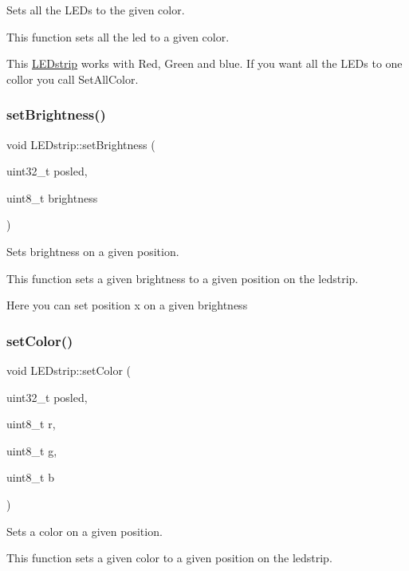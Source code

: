 Sets all the L\+E\+Ds to the given color. 

This function sets all the led to a given color.

This \hyperlink{class_l_e_dstrip}{L\+E\+Dstrip} works with Red, Green and blue. If you want all the L\+E\+Ds to one collor you call Set\+All\+Color. \mbox{\label{class_l_e_dstrip_a75c168fb81979cfa453f8fa5f758bfac}} 
\subsubsection{\texorpdfstring{set\+Brightness()}{setBrightness()}}
{\footnotesize\ttfamily void L\+E\+Dstrip\+::set\+Brightness (\begin{DoxyParamCaption}\item[{uint32\+\_\+t}]{posled,  }\item[{uint8\+\_\+t}]{brightness }\end{DoxyParamCaption})}



Sets brightness on a given position. 

This function sets a given brightness to a given position on the ledstrip.

Here you can set position x on a given brightness \mbox{\label{class_l_e_dstrip_abccaa5762ec0a8cc6ff1de17d709cf96}} 
\subsubsection{\texorpdfstring{set\+Color()}{setColor()}}
{\footnotesize\ttfamily void L\+E\+Dstrip\+::set\+Color (\begin{DoxyParamCaption}\item[{uint32\+\_\+t}]{posled,  }\item[{uint8\+\_\+t}]{r,  }\item[{uint8\+\_\+t}]{g,  }\item[{uint8\+\_\+t}]{b }\end{DoxyParamCaption})}



Sets a color on a given position. 

This function sets a given color to a given position on the ledstrip.

